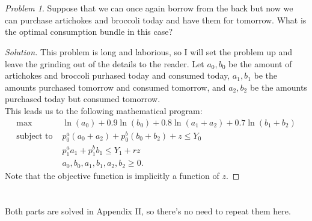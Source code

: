 \documentclass[12pt]{article}
\theoremstyle{definition}
\theoremstyle{remark}
\newtheorem{prob}{Problem}[section]
\begin{document}
\section{}
\begin{prob}
  Suppose that we can once again borrow from the back but now we can purchase artichokes and broccoli today and have them for tomorrow. What is the optimal consumption bundle in this case?
\end{prob}
\begin{proof}[Solution]
  This problem is long and laborious, so I will set the problem up and leave the grinding out of the details to the reader. Let $a_0, b_0$ be the amount of artichokes and broccoli purhased today and consumed today, $a_1, b_1$ be the amounts purchased tomorrow and consumed tomorrow, and $a_2, b_2$ be the amounts purchased today but consumed tomorrow. \\
  This leads us to the following mathematical program:
  \begin{align*}
    \max &\ln(a_0) + 0.9 \ln(b_0) + 0.8 \ln(a_1 + a_2) + 0.7 \ln(b_1 + b_2) \\
    \text{subject to } &p_0^a(a_0 + a_2) + p_0^b(b_0 + b_2) + z \leq Y_0 \\
    &p_1^aa_1 + p_1^bb_1 \leq Y_1 + rz \\
    &a_0, b_0, a_1, b_1, a_2, b_2 \geq 0.
  \end{align*}
  Note that the objective function is implicitly a function of $z$.
\end{proof}
%
%
\section{}
Both parts are solved in Appendix II, so there's no need to repeat them here.
%
%
\end{document}
